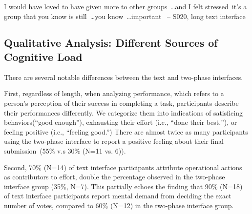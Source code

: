 \begin{displayquote}
I would have loved to have given more to other groups~\ldots and I felt stressed~\bracketellipsis it's a group that you know is still~\ldots you know~\ldots important~\bracketellipsis
\noindent \hfill -- S020, long text interface
\end{displayquote}


\subsection{Qualitative Analysis: Different Sources of Cognitive Load}
There are several notable differences between the text and two-phase interfaces. 

First, regardless of length, when analyzing performance, which refers to a person's perception of their success in completing a task, participants describe their performances differently. We categorize them into indications of satisficing behaviors(``good enough''), exhausting their effort (i.e., ``done their best,''), or feeling positive (i.e., ``feeling good.'') There are almost twice as many participants using the two-phase interface to report a positive feeling about their final submission~(55\% v.s 30\% (N=11 vs. 6)).

Second, 70\% (N=14) of text interface participants attribute operational actions as contributors to effort, double the percentage observed in the two-phase interface group (35\%, N=7). This partially echoes the finding that 90\% (N=18) of text interface participants report mental demand from deciding the exact number of votes, compared to 60\% (N=12) in the two-phase interface group.


